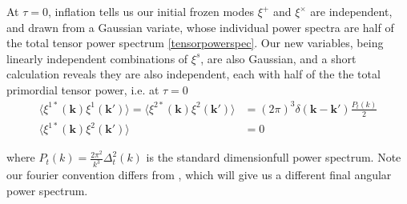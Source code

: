 \documentclass[a4paper,10pt]{article}
\renewcommand{\v}[1]{\mathbf{#1}}
\begin{document}
At $\tau=0$, inflation tells us our initial frozen modes $\xi^+$ and $\xi^\times$ are independent, and drawn from a Gaussian variate, whose individual power spectra are half of the total tensor power spectrum \ref{tensorpowerspec}. Our new variables, being linearly independent combinations of $\xi^s$, are also Gaussian, and a short calculation reveals they are also independent, each with half of the the total primordial tensor power, i.e. at $\tau=0$ 
\begin{equation}
\begin{split}
\langle \xi^{1*}(\v{k})\xi^{1}(\v{k'})\rangle=\langle \xi^{2*}(\v{k})\xi^{2}(\v{k'})\rangle &= (2\pi)^3\delta(\v{k}-\v{k'})\frac{P_t(k)}{2}\\
\langle \xi^{1*}(\v{k})\xi^{2}(\v{k'})\rangle &=0
\end{split}
\label{statprops}
\end{equation}

where $P_t(k) = \frac{2\pi^2}{k^3}\Delta_t^2(k)$ is the standard dimensionfull power spectrum. Note our fourier convention differs from \cite{all-sky}, which will give us a different final angular power spectrum.\\
\end{document}
